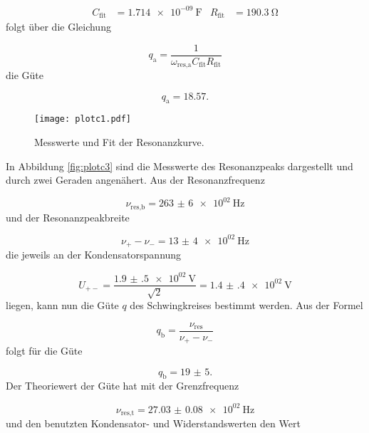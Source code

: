 \begin{align}
  C_\text{fit} & = \SI{1.714e-09}{\farad} & R_\text{fit} & = \SI{190.3}{\ohm}
\end{align}
folgt über die Gleichung

\begin{equation}
  q_\text{a} = \frac{1}{\omega_\text{res,a}C_\text{fit}R_\text{fit}}
\end{equation}
die Güte

\begin{equation}
  q_\text{a} = 18.57.
\end{equation}

\newpage

\begin{figure}[h]
  \centering
  \texttt{[image: plotc1.pdf]}
  \caption{Messwerte und Fit der Resonanzkurve.}
  \label{fig:plotc1}
\end{figure}

In Abbildung \ref{fig:plotc3} sind die Messwerte des Resonanzpeaks dargestellt
und durch zwei Geraden angenähert. Aus der Resonanzfrequenz

\begin{equation}
  \nu_\text{res,b} = \SI{263(6)e02}{\hertz}
\end{equation}
und der Resonanzpeakbreite

\begin{equation}
  \nu_+ - \nu_- = \SI{13(4)e02}{\hertz}
\end{equation}
die jeweils an der Kondensatorspannung

\begin{equation}
  U_{+-} = \frac{\SI{1.9(5)e02}{\V}}{\sqrt{2}} = \SI{1.4(4)e02}{\V}
\end{equation}
liegen, kann nun die Güte $q$ des Schwingkreises bestimmt werden.
Aus der Formel

\begin{equation}
  q_\text{b} = \frac{\nu_\text{res}}{\nu_+ - \nu_-}
\end{equation}
folgt für die Güte

\begin{equation}
  q_\text{b} = \num{19(5)}.
\end{equation}
Der Theoriewert der Güte hat mit der Grenzfrequenz

\begin{equation}
  \nu_\text{res,t} = \SI{27.03(8)e02}{\hertz}
\end{equation}
und den benutzten Kondensator- und Widerstandswerten den Wert

